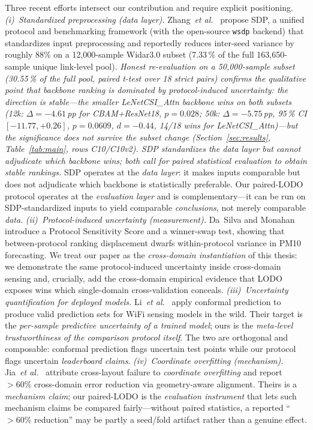 \documentclass[journal,11pt]{IEEEtran}
\newcommand{\CSI}{\text{CSI}}
\newcommand{\etal}{\textit{et al.}}
\begin{document}
Three recent efforts intersect our contribution and require explicit positioning.
\emph{(i)~Standardized preprocessing (data layer).} Zhang~\etal~\cite{zhang2026sdp}
propose SDP, a unified protocol and benchmarking framework (with the open-source
\texttt{wsdp} backend) that standardizes \CSI{} input preprocessing and reportedly
reduces inter-seed variance by roughly $88\%$ on a 12,000-sample Widar3.0 subset (7.33\,\% of the full 163{,}650-sample unique link-level pool). \emph{Honest re-evaluation on a 50{,}000-sample subset (30.55\,\% of the full pool, paired t-test over 18 strict pairs) confirms the qualitative point that backbone ranking is dominated by protocol-induced uncertainty: the direction is stable---the smaller LeNetCSI\_Attn backbone wins on both subsets (12k: $\Delta = -4.61$\,pp for CBAM+ResNet18, $p = 0.028$; 50k: $\Delta = -5.75$\,pp, 95\,\% CI $[-11.77, +0.26]$, $p = 0.0609$, $d = -0.44$, 14/18 wins for LeNetCSI\_Attn)---but the significance does not survive the subset change (Section~\ref{sec:results}, Table~\ref{tab:main}, rows C10/C10v2). SDP standardizes the \emph{data layer} but cannot adjudicate which backbone wins; both call for paired statistical evaluation to obtain stable rankings.}
SDP operates at the \emph{data layer}: it makes inputs comparable but does not
adjudicate which backbone is statistically preferable. Our paired-LODO protocol
operates at the \emph{evaluation layer} and is complementary---it can be run on
SDP-standardized inputs to yield comparable \emph{conclusions}, not merely
comparable \emph{data}.
\emph{(ii)~Protocol-induced uncertainty (measurement).} Da~Silva and Monahan~\cite{dasilva2026pss}
introduce a Protocol Sensitivity Score and a winner-swap test, showing that
between-protocol ranking displacement dwarfs within-protocol variance in PM10
forecasting. We treat our paper as the \emph{cross-domain instantiation} of this
thesis: we demonstrate the same protocol-induced uncertainty inside cross-domain
\CSI{} sensing and, crucially, add the cross-domain empirical evidence that LODO
exposes wins which single-domain cross-validation conceals.
\emph{(iii)~Uncertainty quantification for deployed models.} Li~\etal~\cite{li2026conformal}
apply conformal prediction to produce valid prediction sets for WiFi sensing models
in the wild. Their target is the \emph{per-sample predictive uncertainty of a trained
model}; ours is the \emph{meta-level trustworthiness of the comparison protocol
itself}. The two are orthogonal and composable: conformal prediction flags uncertain
test points while our protocol flags uncertain \emph{leaderboard claims}.
\emph{(iv)~Coordinate overfitting (mechanism).} Jia~\etal~\cite{chen2026perceptalign}
attribute cross-layout failure to \emph{coordinate overfitting} and report $>60\%$
cross-domain error reduction via geometry-aware alignment. Theirs is a
\emph{mechanism claim}; our paired-LODO is the \emph{evaluation instrument} that
lets such mechanism claims be compared fairly---without paired statistics, a reported
``$>60\%$ reduction'' may be partly a seed/fold artifact rather than a genuine effect.
\end{document}
